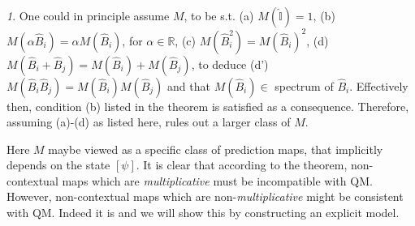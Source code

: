 \documentclass[british,aps,prl,superscriptaddress,nofootinbib,times,reprint]{revtex4-1}
\theoremstyle{plain}
\theoremstyle{plain}
\theoremstyle{definition}
\theoremstyle{remark}
\theoremstyle{remark}
\theoremstyle{remark}
\newtheorem{thmrem}{\protect\remarkname}[thm]
\theoremstyle{plain}
\theoremstyle{plain}
\theoremstyle{plain}
\theoremstyle{definition}
\theoremstyle{definition}
\providecommand{\remarkname}{Remark}
\begin{document}
\begin{thmrem} One could in principle assume $M$, to
be s.t. (a) $M(\hat{\mathbb{I}})=1$, (b)
$M(\alpha\hat{B}_{i})=\alpha M(\hat{B}_{i})$, for
$\alpha\in\mathbb{R}$, (c)
$M(\hat{B}_{i}^{2})=M(\hat{B}_{i})^{2}$, (d)
$M(\hat{B}_{i}+\hat{B}_{j})=M(\hat{B}_{i})+M(\hat{B}_{j})$,
to deduce (d')
$M(\hat{B}_{i}\hat{B}_{j})=M(\hat{B}_{i})M(\hat{B}_{j})$
and that $M(\hat{B}_{i})\in$ spectrum of
$\hat{B}_{i}$. Effectively then, condition (b)
listed in the theorem is satisfied as a
consequence.  Therefore, assuming (a)-(d) as
listed here, rules out a larger class of $M$.
\cite{KochenSpecker} 
\end{thmrem} 
Here $M$ maybe viewed as a specific
class of prediction maps, that implicitly depends
on the state $[\psi]$. It is clear that according to
the theorem, non-contextual maps which are
\emph{multiplicative} must be incompatible with
QM. However, non-contextual maps which are
non-\emph{multiplicative} might be consistent with
QM. Indeed it is and we will show this by constructing an
explicit model.
\end{document}
